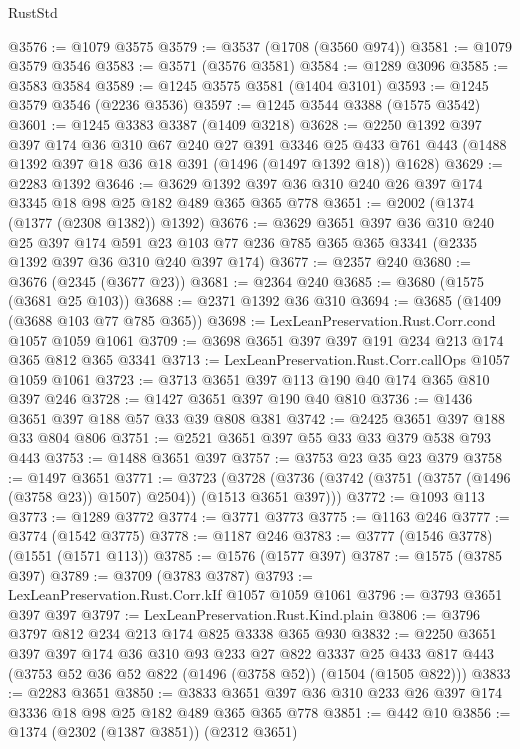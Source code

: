\begin{lexlean}{RustStd}
\begin{coremodule}
@3576 := @1079 @3575
@3579 := @3537 (@1708 (@3560 @974))
@3581 := @1079 @3579 @3546
@3583 := @3571 (@3576 @3581)
@3584 := @1289 @3096
@3585 := @3583 @3584
@3589 := @1245 @3575 @3581 (@1404 @3101)
@3593 := @1245 @3579 @3546 (@2236 @3536)
@3597 := @1245 @3544 @3388 (@1575 @3542)
@3601 := @1245 @3383 @3387 (@1409 @3218)
@3628 := @2250
    @1392
    @397
    @397
    @174
    @36
    @310
    @67
    @240
    @27
    @391
    @3346
    @25
    @433
    @761
    @443
    (@1488 @1392 @397 @18 @36 @18 @391 (@1496 (@1497 @1392 @18)) @1628)
@3629 := @2283 @1392
@3646 := @3629 @1392 @397 @36 @310 @240 @26 @397 @174 @3345 @18 @98 @25 @182 @489 @365 @365 @778
@3651 := @2002 (@1374 (@1377 (@2308 @1382)) @1392)
@3676 := @3629
    @3651
    @397
    @36
    @310
    @240
    @25
    @397
    @174
    @591
    @23
    @103
    @77
    @236
    @785
    @365
    @365
    @3341
    (@2335 @1392 @397 @36 @310 @240 @397 @174)
@3677 := @2357 @240
@3680 := @3676 (@2345 (@3677 @23))
@3681 := @2364 @240
@3685 := @3680 (@1575 (@3681 @25 @103))
@3688 := @2371 @1392 @36 @310
@3694 := @3685 (@1409 (@3688 @103 @77 @785 @365))
@3698 := LexLeanPreservation.Rust.Corr.cond @1057 @1059 @1061
@3709 := @3698 @3651 @397 @397 @191 @234 @213 @174 @365 @812 @365 @3341
@3713 := LexLeanPreservation.Rust.Corr.callOps @1057 @1059 @1061
@3723 := @3713 @3651 @397 @113 @190 @40 @174 @365 @810 @397 @246
@3728 := @1427 @3651 @397 @190 @40 @810
@3736 := @1436 @3651 @397 @188 @57 @33 @39 @808 @381
@3742 := @2425 @3651 @397 @188 @33 @804 @806
@3751 := @2521 @3651 @397 @55 @33 @33 @379 @538 @793 @443
@3753 := @1488 @3651 @397
@3757 := @3753 @23 @35 @23 @379
@3758 := @1497 @3651
@3771 := @3723
    (@3728 (@3736 (@3742 (@3751 (@3757 (@1496 (@3758 @23)) @1507) @2504)) (@1513 @3651 @397)))
@3772 := @1093 @113
@3773 := @1289 @3772
@3774 := @3771 @3773
@3775 := @1163 @246
@3777 := @3774 (@1542 @3775)
@3778 := @1187 @246
@3783 := @3777 (@1546 @3778) (@1551 (@1571 @113))
@3785 := @1576 (@1577 @397)
@3787 := @1575 (@3785 @397)
@3789 := @3709 (@3783 @3787)
@3793 := LexLeanPreservation.Rust.Corr.kIf @1057 @1059 @1061
@3796 := @3793 @3651 @397 @397
@3797 := LexLeanPreservation.Rust.Kind.plain
@3806 := @3796 @3797 @812 @234 @213 @174 @825 @3338 @365 @930
@3832 := @2250
    @3651
    @397
    @397
    @174
    @36
    @310
    @93
    @233
    @27
    @822
    @3337
    @25
    @433
    @817
    @443
    (@3753 @52 @36 @52 @822 (@1496 (@3758 @52)) (@1504 (@1505 @822)))
@3833 := @2283 @3651
@3850 := @3833 @3651 @397 @36 @310 @233 @26 @397 @174 @3336 @18 @98 @25 @182 @489 @365 @365 @778
@3851 := @442 @10
@3856 := @1374 (@2302 (@1387 @3851)) (@2312 @3651)

\end{coremodule}
\end{lexlean}
